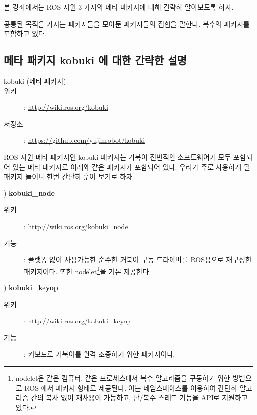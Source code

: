 본 강좌에서는 ROS 지원 3 가지의 메타 패키지에 대해 간략히 알아보도록 하자.

\begin{definition}
공통된 목적을 가지는 패키지들을 모아둔 패키지들의 집합을 말한다. 복수의 패키지를 포함하고 있다.
\end{definition}

\subsection{메타 패키지 kobuki 에 대한 간략한 설명}

\vspace{\baselineskip}
\begin{description}
\item[kobuki (메타 패키지)]
\item[위키]: \url{http://wiki.ros.org/kobuki}
\item[저장소]: \url{https://github.com/yujinrobot/kobuki}
\end{description}

\vspace{\baselineskip}
\noindent
ROS 지원 메타 패키지인 kobuki 패키지는 거북이 전반적인 소프트웨어가 모두 포함되어 있는 메타 패키지로 아래와 같은 패키지가 포함되어 있다. 우리가 주로 사용하게 될 패키지 들이니 한번 간단히 훑어 보기로 하자.

\setcounter{num}{0}

\vspace{\baselineskip}
\noindent{}
\thenum) \textbf{kobuki\_node}
\begin{description}
\item[위키]: \url{http://wiki.ros.org/kobuki_node}
\item[기능]: 플랫폼 없이 사용가능한 순수한 거북이 구동 드라이버를 ROS용으로 재구성한 패키지이다. 또한 nodelet\footnote{nodelet은 같은 컴퓨터, 같은 프로세스에서 복수 알고리즘을 구동하기 위한 방법으로 ROS 에서 패키지 형태로 제공된다. 이는 네임스페이스를 이용하여 간단히 알고리즘 간의 복사 없이 재사용이 가능하고, 단/복수 스레드 기능을 API로 지원하고 있다.}을 기본 제공한다.
\end{description}

\vspace{\baselineskip}
\noindent{}
\thenum) \textbf{kobuki\_keyop}
\begin{description}
\item[위키]: \url{http://wiki.ros.org/kobuki_keyop}
\item[기능]: 키보드로 거북이를 원격 조종하기 위한 패키지이다.
\end{description}


